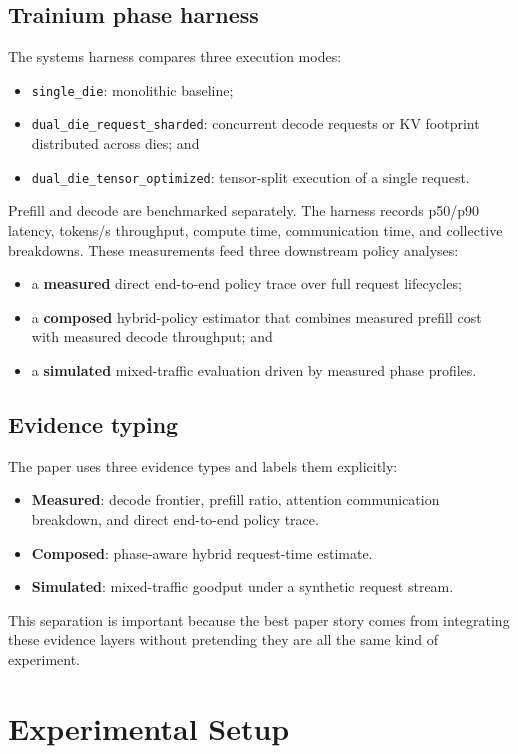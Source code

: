 \documentclass[10pt]{article}
\begin{document}
\subsection{Trainium phase harness}
The systems harness compares three execution modes:
\begin{itemize}[leftmargin=1.3em]
  \item \texttt{single\_die}: monolithic baseline;
  \item \texttt{dual\_die\_request\_sharded}: concurrent decode requests or KV footprint distributed across dies; and
  \item \texttt{dual\_die\_tensor\_optimized}: tensor-split execution of a single request.
\end{itemize}
Prefill and decode are benchmarked separately. The harness records p50/p90 latency, tokens/s throughput, compute time, communication time, and collective breakdowns. These measurements feed three downstream policy analyses:
\begin{itemize}[leftmargin=1.3em]
  \item a \textbf{measured} direct end-to-end policy trace over full request lifecycles;
  \item a \textbf{composed} hybrid-policy estimator that combines measured prefill cost with measured decode throughput; and
  \item a \textbf{simulated} mixed-traffic evaluation driven by measured phase profiles.
\end{itemize}

\subsection{Evidence typing}
The paper uses three evidence types and labels them explicitly:
\begin{itemize}[leftmargin=1.3em]
  \item \textbf{Measured}: decode frontier, prefill ratio, attention communication breakdown, and direct end-to-end policy trace.
  \item \textbf{Composed}: phase-aware hybrid request-time estimate.
  \item \textbf{Simulated}: mixed-traffic goodput under a synthetic request stream.
\end{itemize}
This separation is important because the best paper story comes from integrating these evidence layers without pretending they are all the same kind of experiment.

\section{Experimental Setup}
\end{document}
